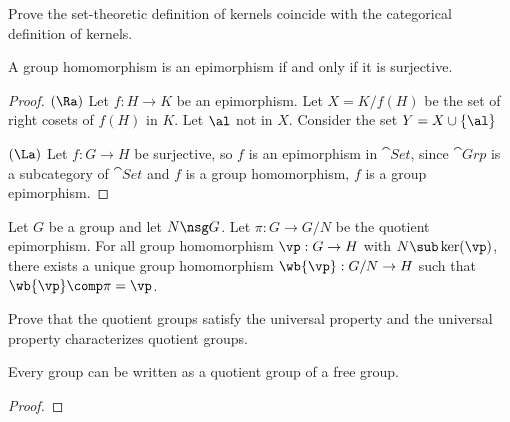 \documentclass[10pt]{article}
\begin{document}
\begin{problem}
    Prove the set-theoretic definition of kernels coincide with the categorical definition of kernels.
\end{problem}
\begin{proposition}
    A group homomorphism is an epimorphism if and only if it is surjective.    
\end{proposition}
\begin{proof}
    $(\Ra)$ Let $f:H\to K$ be an epimorphism. Let $X=K/f(H)$ be the set of right cosets of $f(H)$ in $K$. Let $\al$ not in $X$. Consider the set $Y=X\cup\{\al\}$



    $(\La)$ Let $f:G\to H$ be surjective, so $f$ is an epimorphism in $\cat{Set}$, since $\cat{Grp}$ is a subcategory of $\cat{Set}$ and $f$ is a group homomorphism, $f$ is a group epimorphism.
\end{proof}
\begin{Universal property for quotient groups}
    Let $G$ be a group and let $N\nsg G$. Let $\pi:G\to G/N$ be the quotient epimorphism. For all group homomorphism $\vp:G\to H$ with $N\sub\ker(\vp)$, there exists a unique group homomorphism $\wb{\vp}:G/N\to H$ such that $\wb{\vp}\comp\pi=\vp$.
\end{Universal property for quotient groups}
\begin{center}
\end{center}
\begin{problem}
    Prove that the quotient groups satisfy the universal property and the universal property characterizes quotient groups.
\end{problem}
\begin{proposition}
    Every group can be written as a quotient group of a free group.
\end{proposition}
\begin{proof}
    
\end{proof}
\end{document}
